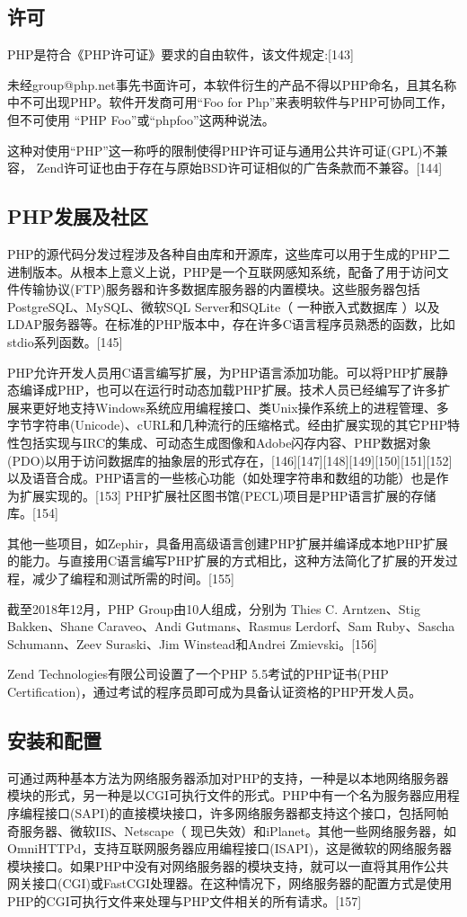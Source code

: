 \subsection{许可}
PHP是符合《PHP许可证》要求的自由软件，该文件规定:[143]

未经group@php.net事先书面许可，本软件衍生的产品不得以PHP命名，且其名称中不可出现PHP。软件开发商可用“Foo for Php”来表明软件与PHP可协同工作，但不可使用 “PHP Foo”或“phpfoo”这两种说法。

这种对使用“PHP”这一称呼的限制使得PHP许可证与通用公共许可证(GPL)不兼容， Zend许可证也由于存在与原始BSD许可证相似的广告条款而不兼容。[144]

\subsection{PHP发展及社区}
PHP的源代码分发过程涉及各种自由库和开源库，这些库可以用于生成的PHP二进制版本。从根本上意义上说，PHP是一个互联网感知系统，配备了用于访问文件传输协议(FTP)服务器和许多数据库服务器的内置模块。这些服务器包括PostgreSQL、MySQL、微软SQL Server和SQLite（ 一种嵌入式数据库 ）以及LDAP服务器等。在标准的PHP版本中，存在许多C语言程序员熟悉的函数，比如stdio系列函数。[145]

PHP允许开发人员用C语言编写扩展，为PHP语言添加功能。可以将PHP扩展静态编译成PHP，也可以在运行时动态加载PHP扩展。技术人员已经编写了许多扩展来更好地支持Windows系统应用编程接口、类Unix操作系统上的进程管理、多字节字符串(Unicode)、cURL和几种流行的压缩格式。经由扩展实现的其它PHP特性包括实现与IRC的集成、可动态生成图像和Adobe闪存内容、PHP数据对象(PDO)以用于访问数据库的抽象层的形式存在，[146][147][148][149][150][151][152] 以及语音合成。PHP语言的一些核心功能（如处理字符串和数组的功能）也是作为扩展实现的。[153] PHP扩展社区图书馆(PECL)项目是PHP语言扩展的存储库。[154]

其他一些项目，如Zephir，具备用高级语言创建PHP扩展并编译成本地PHP扩展的能力。与直接用C语言编写PHP扩展的方式相比，这种方法简化了扩展的开发过程，减少了编程和测试所需的时间。[155]

截至2018年12月，PHP Group由10人组成，分别为 Thies C. Arntzen、Stig Bakken、Shane Caraveo、Andi Gutmans、Rasmus Lerdorf、Sam Ruby、Sascha Schumann、Zeev Suraski、Jim Winstead和Andrei Zmievski。[156]

Zend Technologies有限公司设置了一个PHP 5.5考试的PHP证书(PHP Certification)，通过考试的程序员即可成为具备认证资格的PHP开发人员。

\subsection{安装和配置}
可通过两种基本方法为网络服务器添加对PHP的支持，一种是以本地网络服务器模块的形式，另一种是以CGI可执行文件的形式。PHP中有一个名为服务器应用程序编程接口(SAPI)的直接模块接口，许多网络服务器都支持这个接口，包括阿帕奇服务器、微软IIS、Netscape（ 现已失效）和iPlanet。其他一些网络服务器，如OmniHTTPd，支持互联网服务器应用编程接口(ISAPI)，这是微软的网络服务器模块接口。如果PHP中没有对网络服务器的模块支持，就可以一直将其用作公共网关接口(CGI)或FastCGI处理器。在这种情况下，网络服务器的配置方式是使用PHP的CGI可执行文件来处理与PHP文件相关的所有请求。[157]

